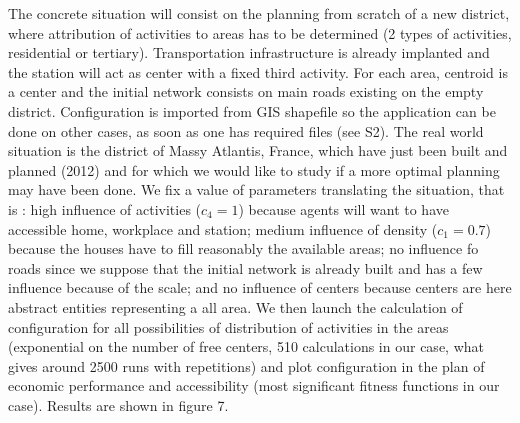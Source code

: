 \documentclass[a4paper,twocolumn,twoside,10pt]{article}
\begin{document}
The concrete situation will consist on the planning from scratch of
a new district, where attribution of activities to areas has to be
determined (2 types of activities, residential or tertiary). Transportation
infrastructure is already implanted and the station will act as center
with a fixed third activity. For each area, centroid is a center and
the initial network consists on main roads existing on the empty district.
Configuration is imported from GIS shapefile so the application can
be done on other cases, as soon as one has required files (see S2).
The real world situation is the district of Massy Atlantis, France,
which have just been built and planned (2012) and for which we would
like to study if a more optimal planning may have been done. We fix
a value of parameters translating the situation, that is : high influence
of activities ($c_{4}=1$) because agents will want to have accessible
home, workplace and station; medium influence of density ($c_{1}=0.7$)
because the houses have to fill reasonably the available areas; no
influence fo roads since we suppose that the initial network is already
built and has a few influence because of the scale; and no influence
of centers because centers are here abstract entities representing
a all area. We then launch the calculation of configuration for all
possibilities of distribution of activities in the areas (exponential
on the number of free centers, 510 calculations in our case, what
gives around 2500 runs with repetitions) and plot configuration in
the plan of economic performance and accessibility (most significant
fitness functions in our case). Results are shown in figure 7.
\end{document}
